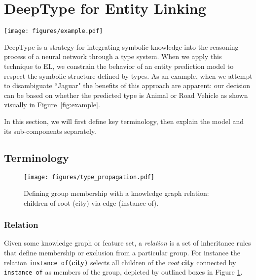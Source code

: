 \documentclass[letterpaper]{article}
\begin{document}
\section{DeepType for Entity Linking}
\begin{figure*}[ht]
    \centering
    \texttt{[image: figures/example.pdf]}
    \caption{Example model output: ``jaguar" refers to different entities depending on context. Predicting the type associated with each word (e.g. animal, region, etc.) helps eliminate options that do not match, and recover the true entity. Bar charts give the system's belief over the type-axis ``\texttt{IsA}", and the table shows how types affects entity probabilities given by Wikipedia links.}
    \label{fig:example}
\end{figure*}

DeepType is a strategy for integrating symbolic knowledge into the reasoning process of a neural network through a type system. When we apply this technique to EL, we constrain the behavior of an entity prediction model to respect the symbolic structure defined by types. As an example, when we attempt to disambiguate ``Jaguar" the benefits of this approach are apparent: our decision can be based on whether the predicted type is Animal or Road Vehicle as shown visually in Figure~\ref{fig:example}.

In this section, we will first define key terminology, then explain the model and its sub-components separately.
\subsection{Terminology}

\begin{figure}[ht]
\centering
\texttt{[image: figures/type\_propagation.pdf]}
\caption{Defining group membership with a knowledge graph relation: children of root (city) via edge (instance of).}
\label{fig:propagation}
\end{figure}

\subsubsection{Relation} Given some knowledge graph or feature set, a {\em relation} is a set of inheritance rules that define membership or exclusion from a particular group. For instance the relation {\tt instance of(}{\bf city}{\tt)} selects all children of the {\em root} {\bf city} connected by {\tt instance of} as members of the group, depicted by outlined boxes in Figure \ref{fig:propagation}.
\end{document}
